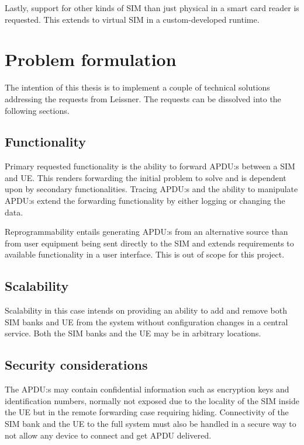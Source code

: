 Lastly, support for other kinds of SIM than just physical in a
smart card reader is requested. This extends to virtual SIM in
a custom-developed runtime.

\section{Problem formulation}
\label{sec:problem-formulation}

The intention of this thesis is to implement a couple of technical
solutions addressing the requests from Leissner. The requests can
be dissolved into the following sections.

\subsection{Functionality}

Primary requested functionality is the ability to forward APDU:s
between a SIM and UE. This renders forwarding the initial problem
to solve and is dependent upon by secondary functionalities.
Tracing APDU:s and the ability to manipulate APDU:s extend the
forwarding functionality by either logging or changing the data.

Reprogrammability entails generating APDU:s from an alternative
source than from user equipment being sent directly to the SIM and
extends requirements to available functionality in a user
interface. This is out of scope for this project.

\subsection{Scalability}

Scalability in this case intends on providing an ability to add and
remove both SIM banks and UE from the system without configuration
changes in a central service. Both the SIM banks and the UE may be
in arbitrary locations.

\subsection{Security considerations}

The APDU:s may contain confidential information such as encryption
keys and identification numbers, normally not exposed due to the
locality of the SIM inside the UE but in the remote forwarding case
requiring hiding. Connectivity of the SIM bank and the UE to the
full system must also be handled in a secure way to not allow any
device to connect and get APDU delivered.

